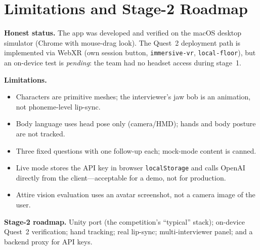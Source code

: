 \documentclass[10pt,a4paper]{article}
\begin{document}
\section{Limitations and Stage-2 Roadmap}
\textbf{Honest status.} The app was developed and verified on the macOS desktop simulator (Chrome with mouse-drag look). The Quest~2 deployment path is implemented via WebXR (own session button, \texttt{immersive-vr}, \texttt{local-floor}), but an on-device test is \emph{pending}: the team had no headset access during stage~1.

\textbf{Limitations.}
\begin{itemize}[leftmargin=1.6em,itemsep=1pt]
  \item Characters are primitive meshes; the interviewer's jaw bob is an animation, not phoneme-level lip-sync.
  \item Body language uses head pose only (camera/HMD); hands and body posture are not tracked.
  \item Three fixed questions with one follow-up each; mock-mode content is canned.
  \item Live mode stores the API key in browser \texttt{localStorage} and calls OpenAI directly from the client---acceptable for a demo, not for production.
  \item Attire vision evaluation uses an avatar screenshot, not a camera image of the user.
\end{itemize}

\textbf{Stage-2 roadmap.} Unity port (the competition's ``typical'' stack); on-device Quest~2 verification; hand tracking; real lip-sync; multi-interviewer panel; and a backend proxy for API keys.
\end{document}
